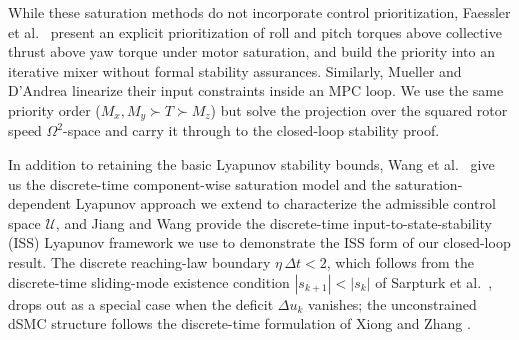 \documentclass[conf]{new-aiaa}
\begin{document}
While these saturation methods do not incorporate control prioritization, Faessler et al.\ \cite{refs:Faessler2017} present an explicit prioritization of roll and pitch torques above collective thrust above yaw torque under motor saturation, and build the priority into an iterative mixer without formal stability assurances. Similarly, Mueller and D’Andrea \cite{refs:Mueller2013} linearize their input constraints inside an MPC loop. We use the same priority order ($M_x, M_y \succ T \succ M_z$) but solve the projection over the squared rotor speed $\Omega^2$-space and carry it through to the closed-loop stability proof.

In addition to retaining the basic Lyapunov stability bounds, Wang et al.\ \cite{refs:Wang2005} give us the discrete-time component-wise saturation model and the saturation-dependent Lyapunov approach we extend to characterize the admissible control space $\mathcal{U}$, and Jiang and Wang \cite{refs:JiangWang2001} provide the discrete-time input-to-state-stability (ISS) Lyapunov framework we use to demonstrate the ISS form of our closed-loop result. The discrete reaching-law boundary $\eta\,\Delta t < 2$, which follows from the discrete-time sliding-mode existence condition $|s_{k+1}| < |s_k|$ of Sarpturk et al.\ \cite{refs:Sarpturk1987}, drops out as a special case when the deficit $\Delta u_k$ vanishes; the unconstrained dSMC structure follows the discrete-time formulation of Xiong and Zhang \cite{refs:Xiong2016}.
\end{document}
